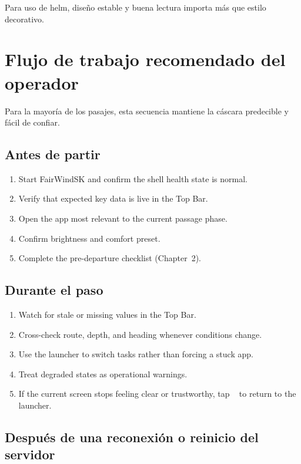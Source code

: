 Para uso de helm, diseño estable y buena lectura importa más que estilo decorativo.

\chapter{Flujo de trabajo recomendado del operador}
\label{ch:workflow}

Para la mayoría de los pasajes, esta secuencia mantiene la cáscara predecible y fácil de confiar.

\section{Antes de partir}

\begin{enumerate}
  \item Start FairWindSK and confirm the shell health state is normal.
  \item Verify that expected key data is live in the Top Bar.
  \item Open the app most relevant to the current passage phase.
  \item Confirm brightness and comfort preset.
  \item Complete the pre-departure checklist (Chapter~2).
\end{enumerate}

\section{Durante el paso}

\begin{enumerate}
  \item Watch for stale or missing values in the Top Bar.
  \item Cross-check route, depth, and heading whenever conditions change.
  \item Use the launcher to switch tasks rather than forcing a stuck app.
  \item Treat degraded states as operational warnings.
  \item If the current screen stops feeling clear or trustworthy, tap
        ~ to return to the launcher.
\end{enumerate}

\section{Después de una reconexión o reinicio del servidor}

